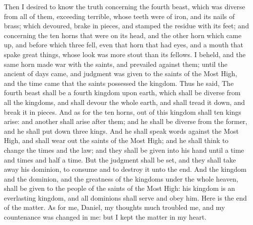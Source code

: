 Then I desired to know the truth concerning the fourth beast, which was diverse from all of them, exceeding terrible, whose teeth were of iron, and its nails of brass; which devoured, brake in pieces, and stamped the residue with its feet; and concerning the ten horns that were on its head, and the other horn which came up, and before which three fell, even that horn that had eyes, and a mouth that spake great things, whose look was more stout than its fellows. I beheld, and the same horn made war with the saints, and prevailed against them; until the ancient of days came, and judgment was given to the saints of the Most High, and the time came that the saints possessed the kingdom.  Thus he said, The fourth beast shall be a fourth kingdom upon earth, which shall be diverse from all the kingdoms, and shall devour the whole earth, and shall tread it down, and break it in pieces. And as for the ten horns, out of this kingdom shall ten kings arise: and another shall arise after them; and he shall be diverse from the former, and he shall put down three kings. And he shall speak words against the Most High, and shall wear out the saints of the Most High; and he shall think to change the times and the law; and they shall be given into his hand until a time and times and half a time. But the judgment shall be set, and they shall take away his dominion, to consume and to destroy it unto the end. And the kingdom and the dominion, and the greatness of the kingdoms under the whole heaven, shall be given to the people of the saints of the Most High: his kingdom is an everlasting kingdom, and all dominions shall serve and obey him. Here is the end of the matter. As for me, Daniel, my thoughts much troubled me, and my countenance was changed in me: but I kept the matter in my heart. 

